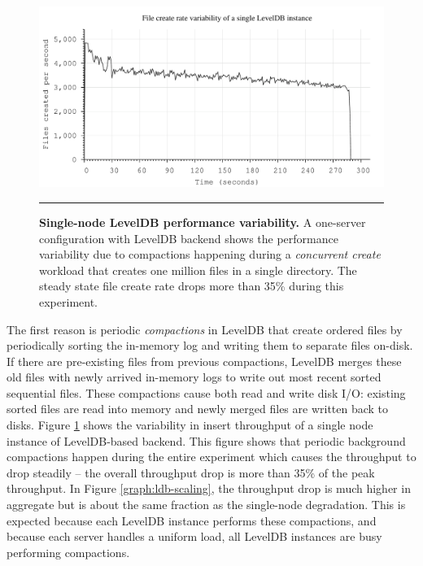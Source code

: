 \begin{figure}[t]  %
\centerline{\includegraphics[scale=0.3]{./figs/ldb_insertrate_onenode}}
\caption{
\textbf{Single-node LevelDB performance variability.}
{\small
A one-server configuration with LevelDB backend shows the performance
variability due to compactions happening during a \textit{concurrent create} 
workload that creates one million files in a single directory. The steady state
file create rate drops more than 35\% during this experiment.
}
}
\vspace{15pt}
\hrule 
\label{graph:ldb-singlenode}
\end{figure}       %

The first reason is periodic \textit{compactions} in LevelDB that create
ordered files 
by periodically sorting the in-memory log and writing them to separate files 
on-disk. If there are pre-existing files from previous compactions, LevelDB merges 
these old files with newly arrived in-memory logs to write out most recent sorted 
sequential files. These compactions cause both read and write disk I/O:
existing sorted files are read into memory and newly merged files are written
back to disks. Figure \ref{graph:ldb-singlenode} shows the variability in insert
throughput of a single node instance of LevelDB-based backend. This figure
shows that periodic background compactions happen during the entire experiment
which causes the throughput to drop steadily -- the overall throughput drop is
more than 35\% of the peak throughput.
In Figure \ref{graph:ldb-scaling}, the throughput drop is much higher in
aggregate but is about the same fraction as the single-node degradation.
This is expected because each LevelDB instance performs these compactions, and 
because each \giga{} server handles a uniform load, all LevelDB instances are busy
performing compactions.  

